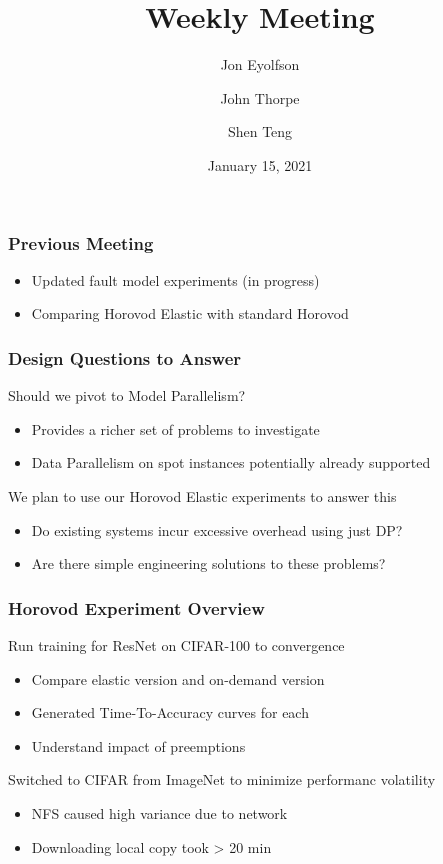 
\title{Weekly Meeting}
\date{January 15, 2021}
\author{Jon Eyolfson \and John Thorpe \and Shen Teng}



  \begin{frame}[plain]
    \titlepage
  \end{frame}

  \setcounter{framenumber}{0}

  \begin{frame}
    \frametitle{Previous Meeting}

    \begin{itemize}
      \item Updated fault model experiments (in progress)
      \item Comparing Horovod Elastic with standard Horovod
    \end{itemize}
  \end{frame}

  \begin{frame}
    \frametitle{Design Questions to Answer}

    Should we pivot to Model Parallelism?
    \begin{itemize}
      \item Provides a richer set of problems to investigate
      \item Data Parallelism on spot instances potentially already supported
    \end{itemize}

    \vspace{2em}
    We plan to use our Horovod Elastic experiments to answer this
    \begin{itemize}
      \item Do existing systems incur excessive overhead using just DP?
      \item Are there simple engineering solutions to these problems?
    \end{itemize}
  \end{frame}

  \begin{frame}
    \frametitle{Horovod Experiment Overview}

    Run training for ResNet on CIFAR-100 to convergence
    \begin{itemize}
      \item Compare elastic version and on-demand version
      \item Generated Time-To-Accuracy curves for each
      \item Understand impact of preemptions
    \end{itemize}

    \vspace{2em}
    Switched to CIFAR from ImageNet to minimize performanc volatility
    \begin{itemize}
      \item NFS caused high variance due to network
      \item Downloading local copy took > 20 min
    \end{itemize}
  \end{frame}

